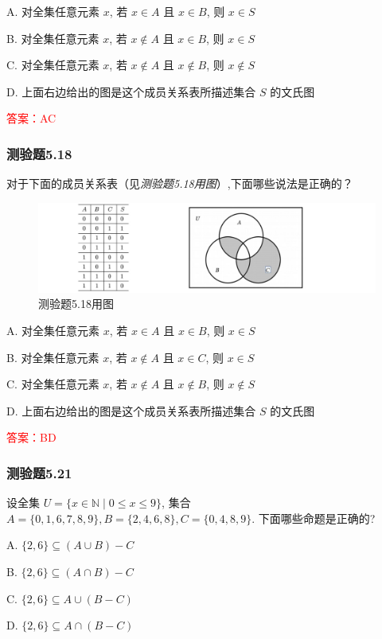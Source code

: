 \documentclass[UTF8, heading=true]{ctexart}
\begin{document}
A. 对全集任意元素 $x$, 若 $x \in A$ 且 $x \in B$, 则 $x \in S$

B. 对全集任意元素 $x$, 若 $x \notin A$ 且 $x \in B$, 则 $x \in S$

C. 对全集任意元素 $x$, 若 $x \notin A$ 且 $x \notin B$, 则 $x \notin S$

D. 上面右边给出的图是这个成员关系表所描述集合 $S$ 的文氏图

\textcolor{red}{答案：AC}


\subsubsection{测验题5.18}
对于下面的成员关系表（见\textit{测验题5.18用图}）,下面哪些说法是正确的？

\begin{figure}[htbp]
  \centering
  \includegraphics[width=1\textwidth]{5.18.jpg} %
  \caption{测验题5.18用图}
\end{figure}

A. 对全集任意元素 $x$, 若 $x \in A$ 且 $x \in B$, 则 $x \in S$

B. 对全集任意元素 $x$, 若 $x \notin A$ 且 $x \in C$, 则 $x \in S$

C. 对全集任意元素 $x$, 若 $x \notin A$ 且 $x \notin B$, 则 $x \notin S$

D. 上面右边给出的图是这个成员关系表所描述集合 $S$ 的文氏图



\textcolor{red}{答案：BD}

\subsubsection{测验题5.21}

设全集 $U=\{x \in \mathbb{N} \mid 0 \leq x \leq 9\}$, 集合 $A=\{0,1,6,7,8,9\}, B=\{2,4,6,8\}, C=\{0,4,8,9\}$. 下面哪些命题是正确的?

A. $\{2,6\} \subseteq(A \cup B)-C$

B. $\{2,6\} \subseteq(A \cap B)-C$

C. $\{2,6\} \subseteq A \cup(B-C)$

D. $\{2,6\} \subseteq A \cap(B-C)$
\end{document}
